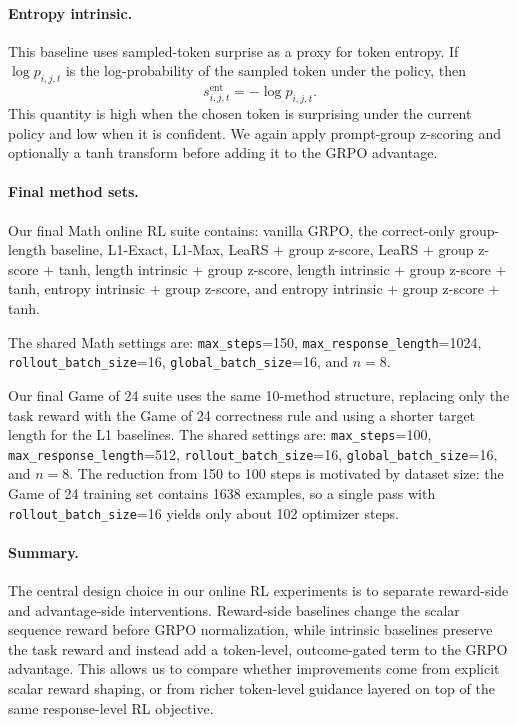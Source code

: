 \paragraph{Entropy intrinsic.}
This baseline uses sampled-token surprise as a proxy for token entropy. If \(\log p_{i,j,t}\) is the log-probability of the sampled token under the policy, then
\[
s_{i,j,t}^{\mathrm{ent}} = -\log p_{i,j,t}.
\]
This quantity is high when the chosen token is surprising under the current policy and low when it is confident. We again apply prompt-group z-scoring and optionally a tanh transform before adding it to the GRPO advantage.

\paragraph{Final method sets.}
Our final Math online RL suite contains: vanilla GRPO, the correct-only group-length baseline, L1-Exact, L1-Max, LeaRS + group z-score, LeaRS + group z-score + tanh, length intrinsic + group z-score, length intrinsic + group z-score + tanh, entropy intrinsic + group z-score, and entropy intrinsic + group z-score + tanh.

The shared Math settings are: \texttt{max\_steps}=150, \texttt{max\_response\_length}=1024, \texttt{rollout\_batch\_size}=16, \texttt{global\_batch\_size}=16, and \(n=8\).

Our final Game of 24 suite uses the same 10-method structure, replacing only the task reward with the Game of 24 correctness rule and using a shorter target length for the L1 baselines. The shared settings are: \texttt{max\_steps}=100, \texttt{max\_response\_length}=512, \texttt{rollout\_batch\_size}=16, \texttt{global\_batch\_size}=16, and \(n=8\). The reduction from 150 to 100 steps is motivated by dataset size: the Game of 24 training set contains 1638 examples, so a single pass with \texttt{rollout\_batch\_size}=16 yields only about 102 optimizer steps.

\paragraph{Summary.}
The central design choice in our online RL experiments is to separate reward-side and advantage-side interventions. Reward-side baselines change the scalar sequence reward before GRPO normalization, while intrinsic baselines preserve the task reward and instead add a token-level, outcome-gated term to the GRPO advantage. This allows us to compare whether improvements come from explicit scalar reward shaping, or from richer token-level guidance layered on top of the same response-level RL objective.
